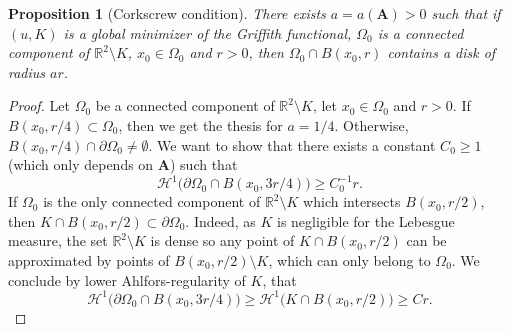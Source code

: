 \documentclass[12pt]{article}
\newtheorem{proposition}[theorem]{Proposition}
\theoremstyle{definition}
\theoremstyle{remark}
\numberwithin{equation}{section}
\newcommand{\dd}{\partial}
\newcommand{\R}{\mathbb{R}}
\newcommand{\A}{\mathbf{A}}
\renewcommand{\H}{\mathcal{H}}
\begin{document}
\begin{proposition}[Corkscrew condition]\label{prop_bigdisk}
    \label{PropDisk}
    There exists $a = a(\A) >0$ such that if $(u,K)$ is a global minimizer of the Griffith functional, $\Omega_0$
    is a connected component of $\R^2\setminus K$, $x_0\in\Omega_0$ and $r>0$, then $\Omega_0\cap B(x_0,r)$
    contains a disk of radius $ar$.
\end{proposition}

\begin{proof}
    Let $\Omega_0$ be a connected component of $\R^2\setminus K$, let $x_0\in\Omega_0$ and $r>0$. If $B(x_0,r/4)
    \subset\Omega_0$, then we get the thesis for $a=1/4$. Otherwise, $B(x_0,r/4) \cap
    \partial \Omega_0\neq\emptyset$. We want to show that there exists a constant $C_0 \geq 1$ (which only depends on
    $\A$) such that
    \begin{equation}\label{eq_bigdisk_cr}
        \H^1\bigl(\dd\Omega_0\cap B(x_0,3r/4)\bigr)\geq C_0^{-1} r.
    \end{equation}
    If $\Omega_0$ is the only connected component of $\R^2\setminus K$ which intersects $B(x_0,r/2)$, then $K\cap
    B(x_0,r/2) \subset \dd\Omega_0$. Indeed, as $K$ is negligible for the Lebesgue measure, the set $\R^2 \setminus
    K$ is dense so any point of $K \cap B(x_0,r/2)$ can be approximated by points of $B(x_0,r/2) \setminus K$,
    which can only belong to $\Omega_0$.
    We conclude by lower Ahlfors-regularity of $K$, that
    \begin{equation}
        \H^1\bigl(\dd\Omega_0\cap B(x_0,3r/4)\bigr) \geq \H^1\bigl(K\cap B(x_0,r/2)\bigr)\geq Cr.
    \end{equation}


\end{proof}
\end{document}
